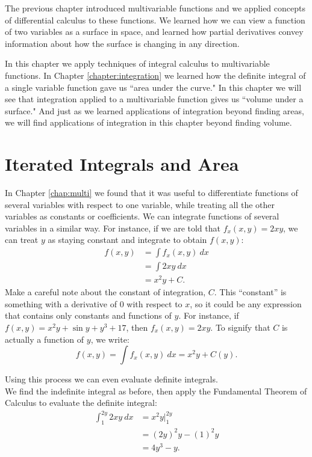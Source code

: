 The previous chapter introduced multivariable functions and we applied concepts of differential calculus to these functions. We learned how we can view a function of two variables as a surface in space, and learned how partial derivatives convey  information about how the surface is changing in any direction.

In this chapter we apply techniques of integral calculus to multivariable functions. In Chapter \ref{chapter:integration} we learned how the definite integral of a single variable function gave us ``area under the curve." In this chapter we will see that integration applied to a multivariable function gives us ``volume under a surface." And just as we learned applications of integration beyond finding areas, we will find applications of integration in this chapter beyond finding volume.

\section{Iterated Integrals and Area}\label{sec:iterated_integrals}

In Chapter \ref{chap:multi} we found that it was useful to differentiate functions of several variables with respect to one variable, while treating all the other variables as constants or coefficients. We can integrate functions of several variables in a similar way. For instance, if we are told that $f_x(x,y) = 2xy$, we can treat $y$ as staying constant and integrate to obtain $f(x,y)$:
\begin{align*}
f(x,y) &= \int f_x(x,y)\ dx\\
				&= \int 2xy\ dx \\
				&= x^2y + C.
\end{align*}
Make a careful note about the constant of integration, $C$. This ``constant'' is something with a derivative of $0$ with respect to $x$, so it could be any expression that contains only constants and functions of $y$. For instance, if $f(x,y) = x^2y+ \sin y + y^3 + 17$, then $f_x(x,y) = 2xy$. To signify that $C$ is actually a function of $y$, we write:
$$f(x,y) = \int f_x(x,y)\ dx  = x^2y+C(y).$$

Using this process we can even evaluate definite integrals.\\

\enlargethispage{9\baselineskip}
{We find the indefinite integral as before, then apply the Fundamental Theorem of Calculus to evaluate the definite integral:
\begin{align*}
\int_1^{2y} 2xy\ dx &= x^2y\Big|_1^{2y}\\
			&= (2y)^2y - (1)^2y \\
			&= 4y^3-y.
\end{align*}
\baselineskip
}\\

